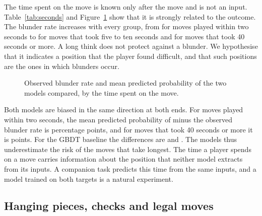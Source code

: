 \documentclass[11pt]{article}
\begin{document}
The time spent on the move is known only after the move and is not an input.
Table~\ref{tab:seconds} and Figure~\ref{fig:seconds} show that it is strongly
related to the outcome. The blunder rate increases with every group, from
 for moves played within two seconds to
 for moves that took five to ten seconds and
 for moves that took 40 seconds or more. A long
think does not protect against a blunder. We hypothesise that it indicates a
position that the player found difficult, and that such positions are the
ones in which blunders occur.

\begin{table}[htbp]\centering\footnotesize
{}
\caption{Test-set results by the time spent on the move, in seconds. The
time spent is known only after the move and is not an input of any model.}
\label{tab:seconds}
\end{table}

\begin{figure}[htbp]\centering
{}
\caption{Observed blunder rate and mean predicted probability of the two
models compared, by the time spent on the move.}
\label{fig:seconds}
\end{figure}

Both models are biased in the same direction at both ends. For moves played
within two seconds, the mean predicted probability of 
minus the observed blunder rate is 
percentage points, and for moves that took 40 seconds or more it is
 points. For the GBDT baseline the
differences are  and
. The models thus underestimate the risk
of the moves that take longest. The time a player spends on a move carries
information about the position that neither model extracts from its inputs.
A companion task predicts this time from the same inputs, and a model trained
on both targets is a natural experiment.

\subsection{Hanging pieces, checks and legal moves}
\end{document}
